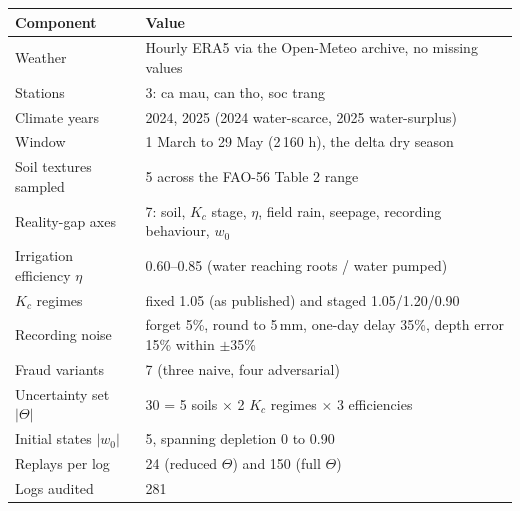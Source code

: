 
\begin{tabular}{@{}p{2.85cm}p{5.60cm}@{}}
\toprule
Component & Value \\
\midrule
Weather & Hourly ERA5 via the Open-Meteo archive, no missing values \\
Stations & 3: ca mau, can tho, soc trang \\
Climate years & 2024, 2025 (2024 water-scarce, 2025 water-surplus) \\
Window & 1 March to 29 May (2\,160 h), the delta dry season \\
Soil textures sampled & 5 across the FAO-56 Table 2 range \\
Reality-gap axes & 7: soil, $K_c$ stage, $\eta$, field rain, seepage, recording behaviour, $w_0$ \\
Irrigation efficiency $\eta$ & 0.60--0.85 (water reaching roots / water pumped) \\
$K_c$ regimes & fixed 1.05 (as published) and staged 1.05/1.20/0.90 \\
Recording noise & forget 5\%, round to 5\,mm, one-day delay 35\%, depth error 15\% within $\pm$35\% \\
Fraud variants & 7 (three naive, four adversarial) \\
Uncertainty set $|\Theta|$ & 30 = 5 soils $\times$ 2 $K_c$ regimes $\times$ 3 efficiencies \\
Initial states $|w_0|$ & 5, spanning depletion 0 to 0.90 \\
Replays per log & 24 (reduced $\Theta$) and 150 (full $\Theta$) \\
Logs audited & 281 \\
\bottomrule
\end{tabular}
